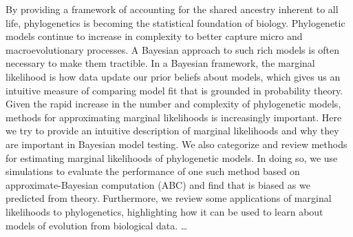 By providing a framework of accounting for the shared ancestry inherent to all
life,
phylogenetics is becoming the statistical foundation of biology.
Phylogenetic models continue to increase in complexity to better capture
micro and macroevolutionary processes.
A Bayesian approach to such rich models is often necessary to make them
tractible.
In a Bayesian framework, 
the marginal likelihood is how data update our prior beliefs about models,
which gives us an intuitive measure of comparing model fit that is grounded in
probability theory.
Given the rapid increase in the number and complexity of phylogenetic models,
methods for approximating marginal likelihoods is increasingly important.
Here we try to provide an intuitive description of marginal likelihoods and why
they are important in Bayesian model testing.
We also categorize and review methods for estimating marginal likelihoods of
phylogenetic models.
In doing so, we use simulations to evaluate the performance of one such method
based on approximate-Bayesian computation (ABC) and find that is biased as we
predicted from theory.
Furthermore, we review some applications of marginal likelihoods to
phylogenetics, highlighting how it can be used to learn about models of
evolution from biological data.
\ldots

